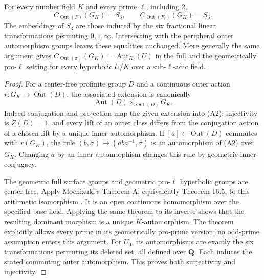 \begin{proposition}
\label{A:tripod-commutant}
For every number field $K$ and every prime $\ell$, including $2$,
\[
 C_{\operatorname{Out}(F)}(G_K)=S_3,
 \qquad
 C_{\operatorname{Out}(F_\ell)}(G_K)=S_3.
\]
The embeddings of $S_3$ are those induced by the six fractional
linear transformations permuting $0,1,\infty$.  Intersecting with
the peripheral outer automorphism groups leaves these equalities
unchanged.  More generally the same argument gives
$C_{\operatorname{Out}(\pi)}(G_K)=\operatorname{Aut}_K(U)$ in
the full and the geometrically pro-$\ell$ setting for every
hyperbolic $U/K$ over a sub-$\ell$-adic field.
\end{proposition}
\begin{proof}
For a center-free profinite group $D$ and a continuous outer action
$r:G_K\to\operatorname{Out}(D)$, the associated extension is
canonically
\[
 \operatorname{Aut}(D)\mathop{\times}_{\operatorname{Out}(D)}G_K.
                                                               \tag{A2}
\]
Indeed conjugation and projection map the given extension into
(A2); injectivity is $Z(D)=1$, and every lift of an outer class
differs from the conjugation action of a chosen lift by a unique
inner automorphism.  If $[a]\in\operatorname{Out}(D)$ commutes
with $r(G_K)$, the rule $(b,\sigma)\mapsto(aba^{-1},\sigma)$
is an automorphism of (A2) over $G_K$.  Changing $a$ by an inner
automorphism changes this rule by geometric inner conjugacy.

The geometric full surface groups and geometric pro-$\ell$
hyperbolic groups are center-free.  Apply Mochizuki's Theorem A,
equivalently Theorem 16.5, to this arithmetic isomorphism
\cite{A_Mochizuki1999}.  It is an open continuous homomorphism
over the specified base field.  Applying the same theorem to its
inverse shows that the resulting dominant morphism is a unique
$K$-automorphism.  The theorem explicitly allows every prime in
its geometrically pro-prime version; no odd-prime assumption
enters this argument.  For $U_0$, its automorphisms are exactly
the six transformations permuting its deleted set, all defined
over $\mathbf Q$.  Each induces the stated commuting outer
automorphism.  This proves both surjectivity and injectivity.
\end{proof}

